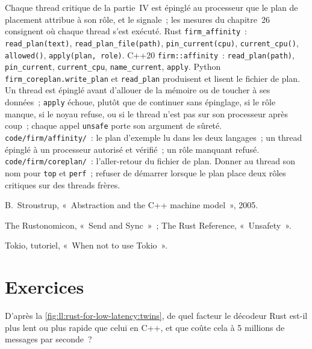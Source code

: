 \begin{build}
 Chaque thread critique de la partie~IV est épinglé au processeur que le plan de placement attribue à son rôle, et le signale~;
les mesures du chapitre~26 consignent où chaque thread s'est exécuté.
 Rust \texttt{firm\_affinity}~: \texttt{read\_plan(text)}, \texttt{read\_plan\_file(path)},
\texttt{pin\_current(cpu)}, \texttt{current\_cpu()}, \texttt{allowed()}, \texttt{apply(plan, role)}. C++20
\texttt{firm::affinity}~: \texttt{read\_plan(path)}, \texttt{pin\_current}, \texttt{current\_cpu}, \texttt{name\_current},
\texttt{apply}. Python \texttt{firm\_coreplan.write\_plan} et \texttt{read\_plan} produisent et lisent le fichier de plan.
 Un thread est épinglé avant d'allouer de la mémoire ou de toucher à ses données~; \texttt{apply} échoue, plutôt que de continuer
sans épinglage, si le rôle manque, si le noyau refuse, ou si le thread n'est pas sur son processeur après coup~; chaque appel \texttt{unsafe}
porte son argument de sûreté.
 \texttt{code/firm/affinity/}~: le plan d'exemple lu dans les deux langages~; un thread épinglé à un processeur
autorisé et vérifié~; un rôle manquant refusé. \texttt{code/firm/coreplan/}~: l'aller-retour du fichier de plan.
 Donner au thread son nom pour \texttt{top} et \texttt{perf}~; refuser de démarrer lorsque le plan place deux rôles critiques
sur des threads frères.
\end{build}

\begin{omsources}
\item B.~Stroustrup, «~Abstraction and the C++ machine model~», 2005.
\item The Rustonomicon, «~Send and Sync~»~; The Rust Reference, «~Unsafety~».
\item Tokio, tutoriel, «~When not to use Tokio~».
\end{omsources}

\section{Exercices}

\begin{exercise}[$\star$]\label{exo:ll:rust-for-low-latency:1}
D'après la \cref{fig:ll:rust-for-low-latency:twins}, de quel facteur le décodeur Rust est-il plus lent ou plus rapide que celui en C++, et
que coûte cela à 5 millions de messages par seconde~?
\end{exercise}

